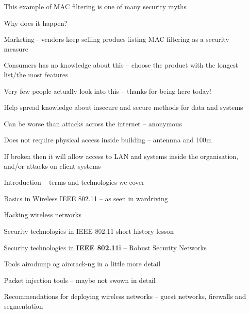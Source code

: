 \documentclass[Screen16to9,17pt]{foils}
\begin{document}
\begin{list1}
\item This example of MAC filtering is one of many security myths
\item Why does it happen?
\begin{list2}
\item Marketing - vendors keep selling producs listing MAC filtering as a security measure
\item Consumers has no knowledge about this -- choose the product with the longest list/the most features
\item Very few people actually look into this -- thanks for being here today!
\end{list2}
\item Help spread knowledge about insecure and secure methods for data and systems
\end{list1}







\begin{list2}
\item Can be worse than attacks across the internet -- anonymous
\item Does not require physical access inside building -- antennna and 100m
\item If broken then it will allow access to LAN and systems inside the organisation, and/or attacks on client systems
\end{list2}





\begin{list1}
\item Introduction -- terms and technologies we cover
\item Basics in Wireless IEEE 802.11 -- as seen in wardriving
\item Hacking wireless networks
\item Security technologies in IEEE 802.11 short history lesson
\item Security technologies in {\bf IEEE 802.11i} -- Robust Security Networks
\item Tools airodump og aircrack-ng in a little more detail
\item Packet injection tools -- maybe not swown in detail
\item Recommendations for deploying wireless networks -- guest networks, firewalls and segmentation
\end{list1}
\end{document}
